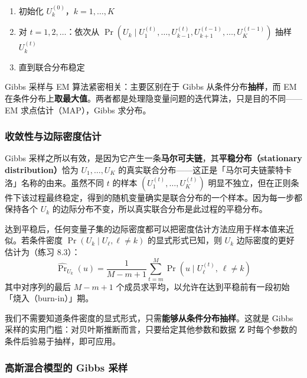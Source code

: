 \begin{enumerate}
    \item 初始化 $U_k^{(0)}$，$k=1,\ldots,K$
    \item 对 $t=1,2,\ldots$：依次从 $\Pr(U_k \mid U_1^{(t)},\ldots,U_{k-1}^{(t)},U_{k+1}^{(t-1)},\ldots,U_K^{(t-1)})$ 抽样 $U_k^{(t)}$
    \item 直到联合分布稳定
\end{enumerate}

\begin{remark}
    Gibbs 采样与 EM 算法紧密相关：主要区别在于 Gibbs 从条件分布\textbf{抽样}，而 EM 在条件分布上\textbf{取最大值}。两者都是处理隐变量问题的迭代算法，只是目的不同——EM 求点估计（MAP），Gibbs 求分布。
\end{remark}

\subsubsection{收敛性与边际密度估计}

Gibbs 采样之所以有效，是因为它产生一条\textbf{马尔可夫链}，其\textbf{平稳分布（stationary distribution）}恰为 $U_1, \ldots, U_K$ 的真实联合分布——这正是「马尔可夫链蒙特卡洛」名称的由来。虽然不同 $t$ 的样本 $(U_1^{(t)}, \ldots, U_K^{(t)})$ 明显不独立，但在正则条件下该过程最终稳定，得到的随机变量确实是联合分布的一个样本。因为每一步都保持各个 $U_k$ 的边际分布不变，所以真实联合分布是此过程的平稳分布。

达到平稳后，任何变量子集的边际密度都可以把密度估计方法应用于样本值来近似。若条件密度 $\Pr(U_k \mid U_\ell, \ell \neq k)$ 的显式形式已知，则 $U_k$ 边际密度的更好估计为（练习 8.3）：
\begin{equation}\label{eq:8_50}
    \widehat{\Pr}_{U_k}(u) = \frac{1}{M-m+1}\sum_{t=m}^{M} \Pr(u \mid U_\ell^{(t)},\ \ell \neq k)
\end{equation}
其中对序列的最后 $M-m+1$ 个成员求平均，以允许在达到平稳前有一段初始「烧入（burn-in）」期。

\begin{remark}
    我们不需要知道条件密度的显式形式，只需\textbf{能够从条件分布抽样}。这就是 Gibbs 采样的实用门槛：对贝叶斯推断而言，只要给定其他参数和数据 $\mathbf{Z}$ 时每个参数的条件后验易于抽样，即可应用。
\end{remark}

\subsubsection{高斯混合模型的 Gibbs 采样}

